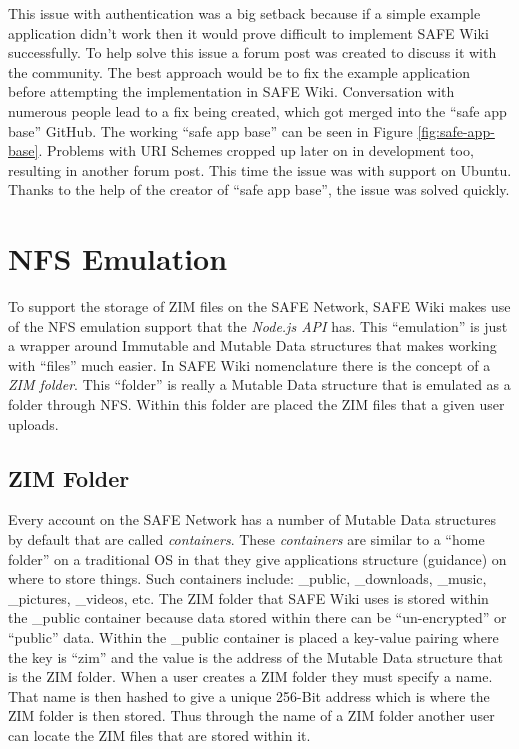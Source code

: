 This issue with authentication was a big setback because if a simple example application didn't work then it would prove difficult to implement SAFE Wiki successfully. To help solve this issue a forum post\cite{safe-app-base-forummacfix} was created to discuss it with the community. The best approach would be to fix the example application before attempting the implementation in SAFE Wiki. Conversation with numerous people lead to a fix being created\cite{safe-app-base-fix}, which got merged into the ``safe app base'' GitHub. The working ``safe app base'' can be seen in Figure \ref{fig:safe-app-base}. Problems with URI Schemes cropped up later on in development too, resulting in another forum post\cite{uri-scheme-ubuntu}. This time the issue was with support on Ubuntu. Thanks to the help of the creator of ``safe app base'', the issue was solved quickly.

\section{NFS Emulation}

To support the storage of ZIM files on the SAFE Network, SAFE Wiki makes use of the NFS emulation support that the \textit{Node.js API} has. This ``emulation'' is just a wrapper around Immutable and Mutable Data structures that makes working with ``files'' much easier. In SAFE Wiki nomenclature there is the concept of a \textit{ZIM folder}. This ``folder'' is really a Mutable Data structure that is emulated as a folder through NFS. Within this folder are placed the ZIM files that a given user uploads.

\subsection{ZIM Folder}

Every account on the SAFE Network has a number of Mutable Data structures by default that are called \textit{containers}. These \textit{containers} are similar to a ``home folder'' on a traditional OS in that they give applications structure (guidance) on where to store things. Such containers include: \_public, \_downloads, \_music, \_pictures, \_videos, etc. The ZIM folder that SAFE Wiki uses is stored within the \_public container because data stored within there can be ``un-encrypted'' or ``public'' data. Within the \_public container is placed a key-value pairing where the key is ``zim'' and the value is the address of the Mutable Data structure that is the ZIM folder. When a user creates a ZIM folder they must specify a name. That name is then hashed to give a unique 256-Bit address which is where the ZIM folder is then stored. Thus through the name of a ZIM folder another user can locate the ZIM files that are stored within it.

